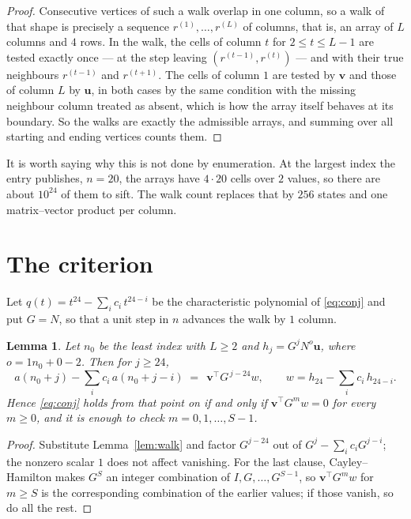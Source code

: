 \documentclass[11pt,a4paper]{article}
\theoremstyle{plain}
\newtheorem{lemma}[theorem]{Lemma}
\theoremstyle{definition}
\begin{document}
\begin{proof}
Consecutive vertices of such a walk overlap in one column, so a walk of that shape is
precisely a sequence $r^{(1)},\dots,r^{(L)}$ of columns, that is, an array of $L$ columns
and $4$ rows. In the walk, the cells of column $t$ for $2\le t\le L-1$ are tested
exactly once --- at the step leaving $(r^{(t-1)},r^{(t)})$ --- and with their true
neighbours $r^{(t-1)}$ and $r^{(t+1)}$. The cells of column $1$ are tested by
$\mathbf{v}$ and those of column $L$ by $\mathbf{u}$, in both cases by the same condition
with the missing neighbour column treated as absent, which is how the array itself behaves at
its boundary. So the walks are exactly the admissible arrays, and summing over all starting
and ending vertices counts them.
\end{proof}


It is worth saying why this is not done by enumeration. At the largest index the entry
publishes, $n=20$, the arrays have $4\cdot20$ cells over
$2$ values, so there are about $10^{24}$ of them to sift. The
walk count replaces that by $256$ states and one matrix--vector product per column.
\section{The criterion}

Let $q(t)=t^{24}-\sum_i c_i\,t^{24-i}$ be the characteristic polynomial of
\eqref{eq:conj} and put $G=N$, so that a unit step in $n$ advances the walk by
$1$ column.

\begin{lemma}\label{lem:crit}
Let $n_0$ be the least index with $L\ge2$ and $h_j=G^{j}N^{o}\mathbf{u}$, where
$o=1n_0+0-2$. Then for $j\ge24$,
\[
a(n_0+j)-\sum_i c_i\,a(n_0+j-i)\;=\;\,\mathbf{v}^{\!\top}G^{\,j-24}w,
\qquad w=h_{24}-\sum_i c_i\,h_{24-i} .
\]
Hence \eqref{eq:conj} holds from that point on if and only if
$\mathbf{v}^{\!\top}G^{m}w=0$ for every $m\ge0$, and it is enough to check
$m=0,1,\dots,S-1$.
\end{lemma}

\begin{proof}
Substitute Lemma~\ref{lem:walk} and factor $G^{j-24}$ out of
$G^{j}-\sum_ic_iG^{j-i}$; the nonzero scalar $1$ does not affect
vanishing. For the last clause, Cayley--Hamilton makes $G^{S}$ an integer combination of
$I,G,\dots,G^{S-1}$, so $\mathbf{v}^{\!\top}G^{m}w$ for $m\ge S$ is the corresponding
combination of the earlier values; if those vanish, so do all the rest.
\end{proof}
\end{document}

